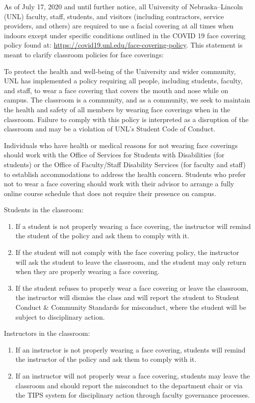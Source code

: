 \documentclass[12pt]{scrartcl}
\begin{document}
As of July 17, 2020 and until further notice, all University of 
Nebraska--Lincoln (UNL) faculty, staff, students, and visitors 
(including contractors, service providers, and others) are required 
to use a facial covering at all times when indoors except under 
specific conditions outlined in the COVID 19 face covering policy 
found at: \url{https://covid19.unl.edu/face-covering-policy}. This 
statement is meant to clarify classroom policies for face coverings:

To protect the health and well-being of the University and wider 
community, UNL has implemented a policy requiring all people, 
including students, faculty, and staff, to wear a face covering 
that covers the mouth and nose while on campus. The classroom is 
a community, and as a community, we seek to maintain the health 
and safety of all members by wearing face coverings when in the 
classroom. Failure to comply with this policy is interpreted as 
a disruption of the classroom and may be a violation of UNL's 
Student Code of Conduct.

Individuals who have health or medical reasons for not wearing 
face coverings should work with the Office of Services for 
Students with Disabilities (for students) or the Office of 
Faculty/Staff Disability Services (for faculty and staff) to 
establish accommodations to address the health concern. Students 
who prefer not to wear a face covering should work with their 
advisor to arrange a fully online course schedule that does 
not require their presence on campus.

Students in the classroom:
\begin{enumerate}
  \item If a student is not properly wearing a face covering, 
  the instructor will remind the student of the policy and ask 
  them to comply with it.
  \item If the student will not comply with the face covering policy, 
  the instructor will ask the student to leave the classroom, 
  and the student may only return when they are properly wearing 
  a face covering.
  \item If the student refuses to properly wear a face covering 
  or leave the classroom, the instructor will dismiss the class 
  and will report the student to Student Conduct \& Community 
  Standards for misconduct, where the student will be subject to disciplinary action.
\end{enumerate}

Instructors in the classroom:
\begin{enumerate}
  \item If an instructor is not properly wearing a face covering, 
  students will remind the instructor of the policy and ask them 
  to comply with it.
  \item If an instructor will not properly wear a face covering, 
  students may leave the classroom and should report the misconduct 
  to the department chair or via the TIPS system for disciplinary 
  action through faculty governance processes.
\end{enumerate}
\end{document}
